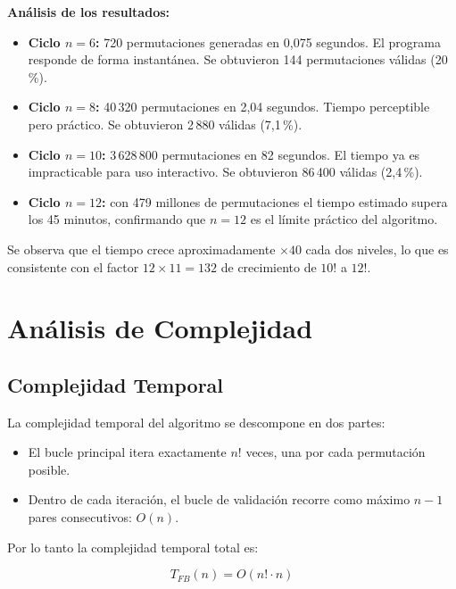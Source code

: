 \documentclass[12pt, a4paper]{article}
\begin{document}
\bigskip
\textbf{Análisis de los resultados:}
\begin{itemize}
  \item \textbf{Ciclo $n=6$:} 720 permutaciones generadas en 0,075 segundos.
        El programa responde de forma instantánea. Se obtuvieron 144 permutaciones
        válidas (20\,\%).
  \item \textbf{Ciclo $n=8$:} 40\,320 permutaciones en 2,04 segundos. Tiempo
        perceptible pero práctico. Se obtuvieron 2\,880 válidas (7,1\,\%).
  \item \textbf{Ciclo $n=10$:} 3\,628\,800 permutaciones en 82 segundos. El tiempo
        ya es impracticable para uso interactivo. Se obtuvieron 86\,400 válidas (2,4\,\%).
  \item \textbf{Ciclo $n=12$:} con 479 millones de permutaciones el tiempo estimado
        supera los 45 minutos, confirmando que $n = 12$ es el límite práctico del algoritmo.
\end{itemize}

Se observa que el tiempo crece aproximadamente $\times 40$ cada dos niveles, lo que
es consistente con el factor $12 \times 11 = 132$ de crecimiento de $10!$ a $12!$.

\section{Análisis de Complejidad}

\subsection{Complejidad Temporal}

La complejidad temporal del algoritmo se descompone en dos partes:

\begin{itemize}
  \item El bucle principal itera exactamente $n!$ veces, una por cada permutación posible.
  \item Dentro de cada iteración, el bucle de validación recorre como máximo $n-1$
        pares consecutivos: $O(n)$.
\end{itemize}

Por lo tanto la complejidad temporal total es:

\begin{equation}
  T_{FB}(n) = O(n! \cdot n)
\end{equation}
\end{document}
